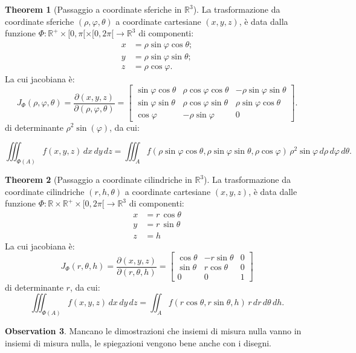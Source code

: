 \documentclass[leqno]{article}
\theoremstyle{definition}
\numberwithin{equation}{section}
\newtheorem{theorem}{Theorem}[section]
\newtheorem{observation}[theorem]{Observation}
\theoremstyle{remark}
\begin{document}
	\begin{theorem}[Passaggio a coordinate sferiche in $\mathbb{R}^3$]
		La trasformazione da coordinate sferiche $(\rho,\varphi,\theta)$ a coordinate cartesiane $(x,y,z)$, è data dalla funzione $\Phi : \mathbb{R}^+ \times [0,\pi[ \times [0,2\pi[ \to \mathbb{R}^3$ di componenti:
		\begin{align*}
			x&=\rho \sin \varphi \cos \theta ;\\y&=\rho \sin \varphi \sin \theta ;\\z&=\rho \cos \varphi .
		\end{align*}
		La cui jacobiana è:
		\begin{equation}
			J _{\Phi}(\rho ,\varphi ,\theta )=\dfrac{\partial(x,y,z)}{\partial(\rho,\varphi,\theta)}={\begin{bmatrix}\sin \varphi \cos \theta &\rho \cos \varphi \cos \theta &-\rho \sin \varphi \sin \theta \\\sin \varphi \sin \theta &\rho \cos \varphi \sin \theta &\rho \sin \varphi \cos \theta \\\cos \varphi &-\rho \sin \varphi &0\end{bmatrix}}.
		\end{equation}
		di determinante $\rho^2 \sin(\varphi)$, da cui:
		
		\begin{equation}
			\iiint _{\Phi(A)}f(x,y,z)\,dx\,dy\,dz=\iiint _{A}f(\rho \sin \varphi \cos \theta ,\rho \sin \varphi \sin \theta ,\rho \cos \varphi )\,\rho ^{2}\sin \varphi \,d\rho \,d\varphi \,d\theta .
		\end{equation}
	\end{theorem}
	\begin{theorem}[Passaggio a coordinate cilindriche in $\mathbb{R}^3$]
		La trasformazione da coordinate cilindriche $(r,h,\theta)$ a coordinate cartesiane $(x,y,z)$, è data dalle funzione $\Phi : \mathbb{R} \times \mathbb{R}^+ \times [0,2\pi[ \to \mathbb{R}^3$ di componenti: 
		\begin{align*}
			x&=r\,\cos \theta \\y&=r\,\sin \theta \\z&=h 
		\end{align*}
		La cui jacobiana è:
		\begin{equation}
			J_{\Phi}(r,\theta ,h)={\frac {\partial (x,y,z)}{\partial (r,\theta ,h)}}={\begin{bmatrix}\cos \theta &-r\sin \theta &0\\\sin \theta &r\cos \theta &0 \\ 0 & 0 & 1\end{bmatrix}}
		\end{equation}
		di determinante $r$, da cui:
		\begin{equation}
			\iiint _{\Phi(A)}f(x,y,z)\,dx\,dy\,dz=\iint _{A}f(r\cos \theta ,r\sin \theta , h)\,r\,dr\,d\theta \, dh .
		\end{equation}
	\end{theorem}
	\begin{observation}
		Mancano le dimostrazioni che insiemi di misura nulla vanno in insiemi di misura nulla, le spiegazioni vengono bene anche con i disegni. 
	\end{observation}
\end{document}
